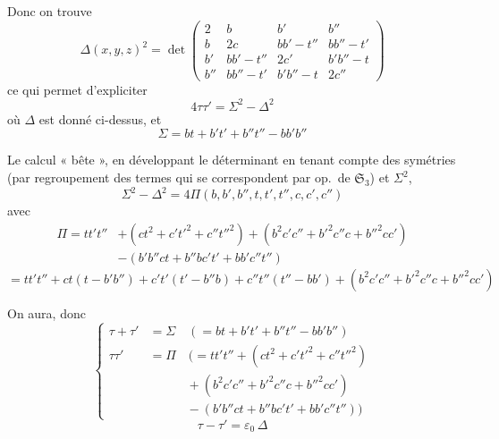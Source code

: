 \documentclass[11pt,a4paper]{article}
\begin{document}
Donc on trouve
\[
  \boxed{\Delta(x,y,z)^2 = \det
  \begin{pmatrix}
    2 & b & b' & b'' \\
    b & 2c & bb' - t'' & bb'' - t' \\
    b' & bb' - t'' & 2c' & b'b'' - t \\
    b'' & bb'' - t' & b'b'' - t & 2c''
  \end{pmatrix}}
\]
ce qui permet d'expliciter
\[
  4\tau\tau' = \Sigma^2 - \Delta^2
\]
\marginal{$\longleftarrow$}
où $\Delta$ est donné ci-dessus, et
\[
  \boxed{\Sigma = bt + b't' + b''t'' - bb'b''}
\]

Le calcul « bête », en développant le déterminant en tenant compte des symétries
(par regroupement des termes qui se correspondent par  op.\ de
$\mathfrak{S}_3$) et $\Sigma^2$,
\[
  \Sigma^2 - \Delta^2 = 4\Pi(b,b',b'',t,t',t'',c,c',c'')
\]
avec
\[
  \boxed{
  \begin{aligned}
    \Pi = tt't'' &+ (ct^2 + c't'^2 + c''t''^2) + (b^2c'c'' + b'^2c''c + b''^2cc') \\
    &- (b'b''ct + b''bc't' + bb'c''t'')
  \end{aligned}}
\]
\[
  = tt't'' + ct(t - b'b'') + c't'(t' - b''b) + c''t''(t'' - bb')
  + (b^2c'c'' + b'^2c''c + b''^2cc')
\]

On aura, donc
\[
  \left\{
  \begin{aligned}
    \tau + \tau' &= \Sigma \quad (= bt + b't' + b''t'' - bb'b'') \\
    \tau\tau' &= \Pi \quad \bigl(= tt't'' + (ct^2 + c't'^2 + c''t''^2) \\
    &\qquad\quad + (b^2c'c'' + b'^2c''c + b''^2cc') \\
    &\qquad\quad - (b'b''ct + b''bc't' + bb'c''t'')\bigr)
  \end{aligned}
  \right.
\]
\[
  \tau - \tau' = \varepsilon_0\, \Delta
\]
\end{document}
